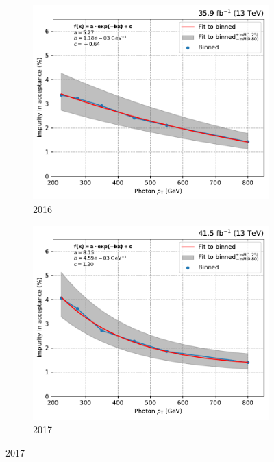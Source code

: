 \begin{figure}[htbp]
    \centering
    \begin{subfigure}[b]{0.32\textwidth}
        \includegraphics[width=\textwidth]{figures/photon_purity/2016/impurity_plot_2016.pdf}
        \caption{2016}
    \end{subfigure}
    \hfill
    \begin{subfigure}[b]{0.32\textwidth}
        \includegraphics[width=\textwidth]{figures/photon_purity/2017/impurity_plot_2017.pdf}
        \caption{2017}
    \end{subfigure}

\end{figure}
